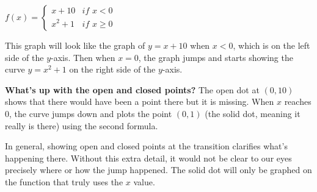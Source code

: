 \documentclass{ximera}
\begin{document}
\begin{example}
$f(x)=\begin{cases} x+10 & \textit{if }x<0\\x^2+1 & \textit{if } x\geq 0\end{cases}$

This graph will look like the graph of $y=x+10$ when $x<0$, which is on the left side of the $y$-axis. Then when $x=0$, the graph jumps and starts showing the curve $y=x^2+1$ on the right side of the $y$-axis.


\textbf{What's up with the open and closed points?} The open dot at $(0,10)$ shows that there would have been a point there but it is missing. When $x$ reaches $0$, the curve jumps down and plots the point $(0,1)$ (the solid dot, meaning it really is there) using the second formula.

In general, showing open and closed points at the transition clarifies what's happening there. Without this extra detail, it would not be clear to our eyes precisely where or how the jump happened. The solid dot will only be graphed on the function that truly uses the $x$ value.
\end{example}
\end{document}
